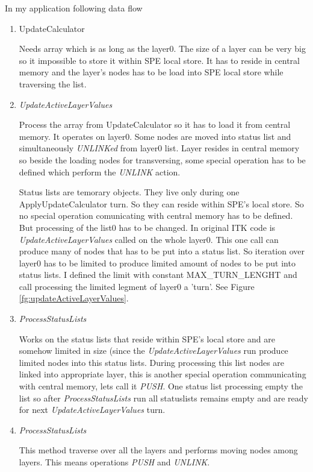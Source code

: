 In my application following data flow
\begin{enumerate}
\item UpdateCalculator
\par
Needs array which is as long as the layer0. The size of a layer can be very big
so it impossible to store it within SPE local store. It has to reside in central
memory and the layer's nodes has to be load into SPE local store while
traversing the list.

\item \emph{UpdateActiveLayerValues}
\par
Process the array from UpdateCalculator so it has to load it from central
memory. It operates on layer0. Some nodes are moved into status list and
simultaneously \emph{UNLINKed} from layer0 list. Layer resides in central
memory so beside the loading nodes for transversing, some special operation has
to be defined which perform the \emph{UNLINK} action.
\par
Status lists are temorary objects. They live
only during one ApplyUpdateCalculator turn. So they can reside within SPE's
local store. So no special operation comunicating with central memory has to be
defined. But processing of the list0 has to be changed. In original ITK code is
\emph{UpdateActiveLayerValues} called on the whole layer0. This one call can
produce many of nodes that has to be put into a status list. So iteration over
layer0 has to be limited to produce limited amount of nodes to be put into
status lists. I defined the limit with constant MAX\_TURN\_LENGHT and call
processing the limited legment of layer0 a 'turn'. See Figure
\ref{fg:updateActiveLayerValues}.

\item \emph{ProcessStatusLists}
\par
Works on the status lists that reside within SPE's local store and are somehow
limited in size (since the \emph{UpdateActiveLayerValues} run produce limited
nodes into this status lists. During processing this list nodes are linked into
appropriate layer, this is another special operation communicating with central
memory, lets call it \emph{PUSH}. One status list processing empty the list
so after \emph{ProcessStatusLists} run all statuslists remains
empty and are ready for next \emph{UpdateActiveLayerValues} turn.

\item \emph{ProcessStatusLists}
\par
This method traverse over all the layers and performs moving nodes among
layers. This means operations \emph{PUSH} and \emph{UNLINK}.
\end{enumerate}

